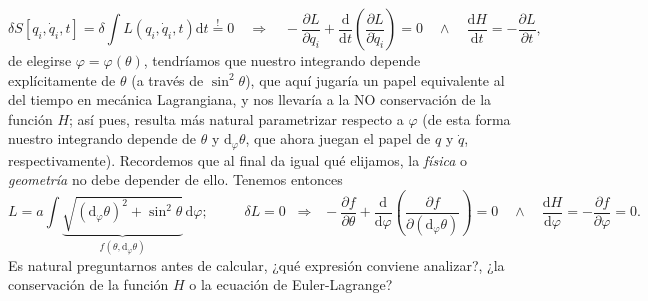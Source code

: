 \documentclass{article}
\begin{document}
\begin{equation*}
    \delta S[q_i,\dot{q}_i,t] = \delta \int L(q_i,\dot{q}_i, t) \mathrm{d}t \overset{!}{=} 0 
    \quad\Rightarrow\quad
    -\frac{\partial L}{\partial q_i}+\frac{\mathrm{d}}{\mathrm{d}t}\left(\frac{\partial L}{\partial \dot{q}_i}\right)=0
    \quad\wedge\quad \frac{\mathrm{d}H}{\mathrm{d}t}=-\frac{\partial L}{\partial t},
\end{equation*}
de elegirse $\varphi=\varphi(\theta)$, tendr\'iamos que nuestro integrando depende expl\'icitamente de $\theta$ (a trav\'es de $\sin^2\theta$), que aqu\'i jugar\'ia un papel equivalente al del tiempo en mec\'anica Lagrangiana, y nos llevar\'ia a la NO conservaci\'on de la funci\'on $H$; as\'i pues, resulta m\'as natural parametrizar respecto a $\varphi$ (de esta forma nuestro integrando depende de $\theta$ y $\mathrm{d}_\varphi\theta$, que ahora juegan el papel de $q$ y $\dot{q}$, respectivamente). Recordemos que al final da igual qu\'e elijamos, la \textit{f\'isica} o \textit{geometr\'ia} no debe depender de ello. Tenemos entonces
\begin{equation}
    L = a\int \underbrace{\sqrt{\left(\mathrm{d}_\varphi\theta\right)^2+\sin^2\theta}}_{f(\theta,\mathrm{d}_\varphi \theta)}\,\mathrm{d}\varphi; 
    \qquad\;\; \delta L=0 \;\;\Rightarrow\;\; -\frac{\partial f}{\partial \theta} + \frac{\mathrm{d}}{\mathrm{d}\varphi}\left(\frac{\partial f}{\partial (\mathrm{d}_\varphi\theta)}\right) = 0
    \quad\wedge\quad
    \frac{\mathrm{d}H}{\mathrm{d}\varphi}=-\frac{\partial f}{\partial\varphi}=0.
\end{equation}
Es natural preguntarnos antes de calcular, ¿qu\'e expresi\'on conviene analizar?, ¿la conservaci\'on de la funci\'on $H$ o la ecuaci\'on de Euler-Lagrange?
\end{document}
